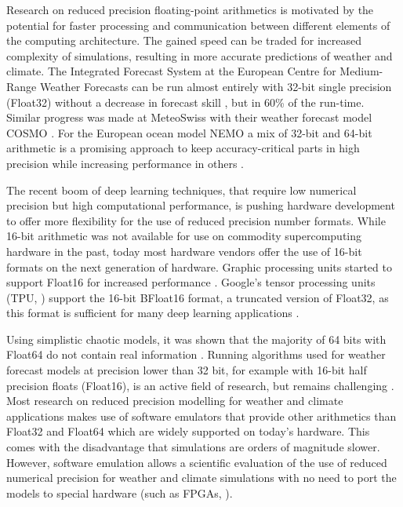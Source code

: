 \documentclass[draft]{agujournal2019}
\begin{document}
Research on reduced precision floating-point arithmetics is motivated by the potential for faster processing and communication between different elements of the computing architecture. The gained speed can be traded for increased complexity of simulations, resulting in more accurate predictions of weather and climate. The Integrated Forecast System at the European Centre for Medium-Range Weather Forecasts can be run almost entirely with 32-bit single precision (Float32) without a decrease in forecast skill \cite{Vana2017}, but in 60\% of the run-time. Similar progress was made at MeteoSwiss with their weather forecast model COSMO \cite{Rudisuhli2013}. For the European ocean model NEMO a mix of 32-bit and 64-bit arithmetic is a promising approach to keep accuracy-critical parts in high precision while increasing performance in others \cite{TintoPrims2019}.

The recent boom of deep learning techniques, that require low numerical precision but high computational performance, is pushing hardware development to offer more flexibility for the use of reduced precision number formats. While 16-bit arithmetic was not available for use on commodity supercomputing hardware in the past, today most hardware vendors offer the use of 16-bit formats on the next generation of hardware. Graphic processing units started to support Float16 for increased performance \cite{Markidis2018}. Google's tensor processing units (TPU, ) support the 16-bit BFloat16 format, a truncated version of Float32, as this format is sufficient for many deep learning applications \cite{Kalamkar2019,Burgess2019,Gupta2015}.

Using simplistic chaotic models, it was shown that the majority of 64 bits with Float64 do not contain real information \cite{Jeffress2017}. Running algorithms used for weather forecast models at precision lower than 32 bit, for example with 16-bit half precision floats (Float16), is an active field of research, but remains challenging \cite{Duben2014,Thornes2017,Hatfield2018,Duben2018}. Most research on reduced precision modelling for weather and climate applications makes use of software emulators \cite{Dawson2017} that provide other arithmetics than Float32 and Float64 which are widely supported on today's hardware. This comes with the disadvantage that simulations are orders of magnitude slower. However, software emulation allows a scientific evaluation of the use of reduced numerical precision for weather and climate simulations with no need to port the models to special hardware (such as FPGAs, ).
\end{document}
